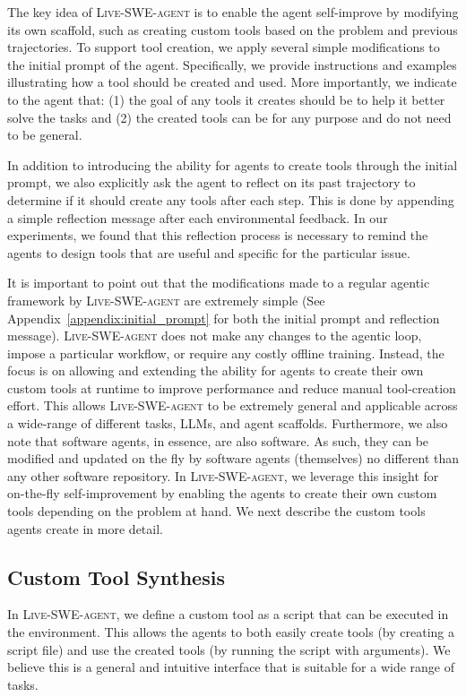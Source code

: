 \documentclass{article}
\newcommand{\tech}{\textsc{Live-SWE-agent}\xspace}
\newcommand{\llm}{LLM\xspace}
\begin{document}
The key idea of \tech is to enable the agent self-improve by modifying its{ own scaffold}{, such as} creating custom tools based on the problem and previous trajectories.
To support tool creation, we apply several simple modifications to the initial prompt of the agent.
Specifically, we provide instructions and examples illustrating how a tool should be created and used.
More importantly, we indicate to the agent that: (1) the goal of any tools it creates should be to help it better solve the tasks and (2) the created tools can be for any purpose and do not need to be general. 

In addition to introducing the ability for agents to create tools through the initial prompt, we also explicitly ask the agent to reflect on its past trajectory to determine if it should create any tools after each step. 
This is done by appending a simple reflection message after each environmental feedback.
In our experiments, we found that this reflection process is necessary to remind the agents to design tools that are useful and specific for the particular issue.

It is important to point out that the modifications made to a regular agentic framework by \tech are extremely simple (See Appendix~\ref{appendix:initial_prompt} for both the initial prompt and reflection message).
\tech does not make any changes to the agentic loop, impose a particular workflow, or require any costly offline training.
Instead, the focus is on allowing and extending the ability for agents to create their own custom tools at runtime to improve performance and reduce manual tool-creation effort.
This allows \tech to be extremely general and applicable across a wide-range of different tasks, \llm{s}, and agent scaffolds. 
Furthermore, we also note that software agents, in essence, are also software.
As such, they can be modified and updated on the fly by software agents (themselves) no different than any other software repository.
In \tech, we leverage this insight for on-the-fly self-improvement by enabling the agents to create their own custom tools depending on the problem at hand.
We next describe the custom tools agents create in more detail.


\subsection{Custom Tool Synthesis}

In \tech, we define a custom tool as a script that can be executed in the environment.
This allows the agents to both easily create tools (by creating a script file) and use the created tools (by running the script with arguments).
We believe this is a general and intuitive interface that is suitable for a wide range of tasks.
\end{document}
